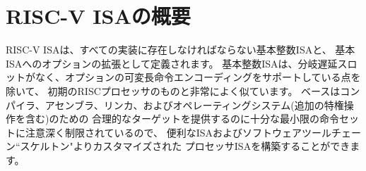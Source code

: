 \begin{comment}
To support more general software development, a set of standard
extensions are defined to provide integer multiply/divide, atomic
operations, and single and double-precision floating-point arithmetic.
The base integer ISA is named ``I'' (prefixed by RV32 or RV64
depending on integer register width), and contains integer
computational instructions, integer loads, integer stores, and
control-flow instructions.  The standard integer multiplication and
division extension is named ``M'', and adds instructions to multiply
and divide values held in the integer registers.  The standard atomic
instruction extension, denoted by ``A'', adds instructions that
atomically read, modify, and write memory for inter-processor
synchronization.  The standard single-precision floating-point
extension, denoted by ``F'', adds floating-point registers,
single-precision computational instructions, and single-precision
loads and stores.  The standard double-precision floating-point
extension, denoted by ``D'', expands the floating-point registers, and
adds double-precision computational instructions, loads, and stores.
The standard ``C'' compressed instruction extension
provides narrower 16-bit forms of common instructions.

Beyond the base integer ISA and the standard GC extensions, we believe
it is rare that a new instruction will provide a significant benefit
for all applications, although it may be very beneficial for a certain
domain.  As energy efficiency concerns are forcing greater
specialization, we believe it is important to simplify the required
portion of an ISA specification.  Whereas other architectures usually
treat their ISA as a single entity, which changes to a new version as
instructions are added over time, RISC-V will endeavor to keep the
base and each standard extension constant over time, and instead layer
new instructions as further optional extensions.  For example, the
base integer ISAs will continue as fully supported standalone ISAs,
regardless of any subsequent extensions.
\end{comment}

\section{RISC-V ISAの概要}

RISC-V ISAは、すべての実装に存在しなければならない基本整数ISAと、
基本ISAへのオプションの拡張として定義されます。
基本整数ISAは、分岐遅延スロットがなく、オプションの可変長命令エンコーディングをサポートしている点を除いて、
初期のRISCプロセッサのものと非常によく似ています。
ベースはコンパイラ、アセンブラ、リンカ、およびオペレーティングシステム(追加の特権操作を含む)のための
合理的なターゲットを提供するのに十分な最小限の命令セットに注意深く制限されているので、
便利なISAおよびソフトウェアツールチェーン``スケルトン"よりカスタマイズされた
プロセッサISAを構築することができます。

